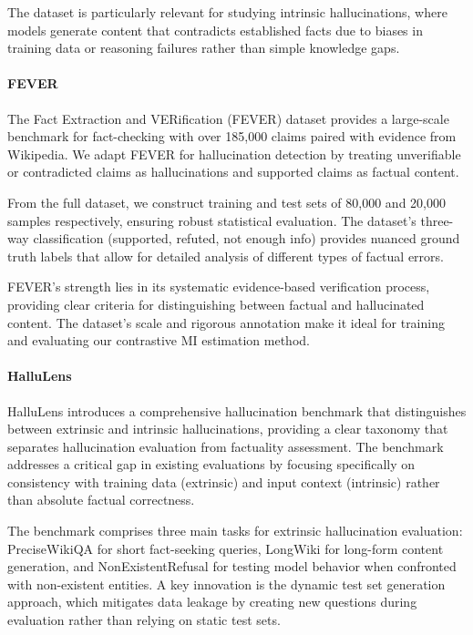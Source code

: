 The dataset is particularly relevant for studying intrinsic hallucinations, where models generate content that contradicts established facts due to biases in training data or reasoning failures rather than simple knowledge gaps.

\paragraph{FEVER}
The Fact Extraction and VERification (FEVER) dataset \citep{thorne2018fever} provides a large-scale benchmark for fact-checking with over 185,000 claims paired with evidence from Wikipedia. We adapt FEVER for hallucination detection by treating unverifiable or contradicted claims as hallucinations and supported claims as factual content.

From the full dataset, we construct training and test sets of 80,000 and 20,000 samples respectively, ensuring robust statistical evaluation. The dataset's three-way classification (supported, refuted, not enough info) provides nuanced ground truth labels that allow for detailed analysis of different types of factual errors.

FEVER's strength lies in its systematic evidence-based verification process, providing clear criteria for distinguishing between factual and hallucinated content. The dataset's scale and rigorous annotation make it ideal for training and evaluating our contrastive MI estimation method.

\paragraph{HalluLens}
HalluLens \citep{bang2025hallulens} introduces a comprehensive hallucination benchmark that distinguishes between extrinsic and intrinsic hallucinations, providing a clear taxonomy that separates hallucination evaluation from factuality assessment. The benchmark addresses a critical gap in existing evaluations by focusing specifically on consistency with training data (extrinsic) and input context (intrinsic) rather than absolute factual correctness.

The benchmark comprises three main tasks for extrinsic hallucination evaluation: PreciseWikiQA for short fact-seeking queries, LongWiki for long-form content generation, and NonExistentRefusal for testing model behavior when confronted with non-existent entities. A key innovation is the dynamic test set generation approach, which mitigates data leakage by creating new questions during evaluation rather than relying on static test sets.

